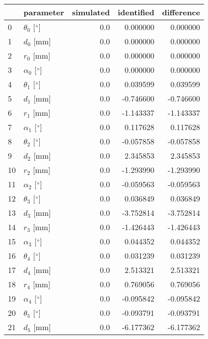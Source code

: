 \documentclass{standalone}%
\begin{document}
%
\normalsize%
\begin{tabular}{llrrr}
\toprule
{} &                 parameter & simulated & identified & difference \\
\midrule
0  &  $\theta_{0}$ [$\degree$] &       0.0 &   0.000000 &   0.000000 \\
1  &              $d_{0}$ [mm] &       0.0 &   0.000000 &   0.000000 \\
2  &              $r_{0}$ [mm] &       0.0 &   0.000000 &   0.000000 \\
3  &  $\alpha_{0}$ [$\degree$] &       0.0 &   0.000000 &   0.000000 \\
4  &  $\theta_{1}$ [$\degree$] &       0.0 &   0.039599 &   0.039599 \\
5  &              $d_{1}$ [mm] &       0.0 &  -0.746600 &  -0.746600 \\
6  &              $r_{1}$ [mm] &       0.0 &  -1.143337 &  -1.143337 \\
7  &  $\alpha_{1}$ [$\degree$] &       0.0 &   0.117628 &   0.117628 \\
8  &  $\theta_{2}$ [$\degree$] &       0.0 &  -0.057858 &  -0.057858 \\
9  &              $d_{2}$ [mm] &       0.0 &   2.345853 &   2.345853 \\
10 &              $r_{2}$ [mm] &       0.0 &  -1.293990 &  -1.293990 \\
11 &  $\alpha_{2}$ [$\degree$] &       0.0 &  -0.059563 &  -0.059563 \\
12 &  $\theta_{3}$ [$\degree$] &       0.0 &   0.036849 &   0.036849 \\
13 &              $d_{3}$ [mm] &       0.0 &  -3.752814 &  -3.752814 \\
14 &              $r_{3}$ [mm] &       0.0 &  -1.426443 &  -1.426443 \\
15 &  $\alpha_{3}$ [$\degree$] &       0.0 &   0.044352 &   0.044352 \\
16 &  $\theta_{4}$ [$\degree$] &       0.0 &   0.031239 &   0.031239 \\
17 &              $d_{4}$ [mm] &       0.0 &   2.513321 &   2.513321 \\
18 &              $r_{4}$ [mm] &       0.0 &   0.769056 &   0.769056 \\
19 &  $\alpha_{4}$ [$\degree$] &       0.0 &  -0.095842 &  -0.095842 \\
20 &  $\theta_{5}$ [$\degree$] &       0.0 &  -0.093791 &  -0.093791 \\
21 &              $d_{5}$ [mm] &       0.0 &  -6.177362 &  -6.177362 \\

\end{tabular}
\end{document}
